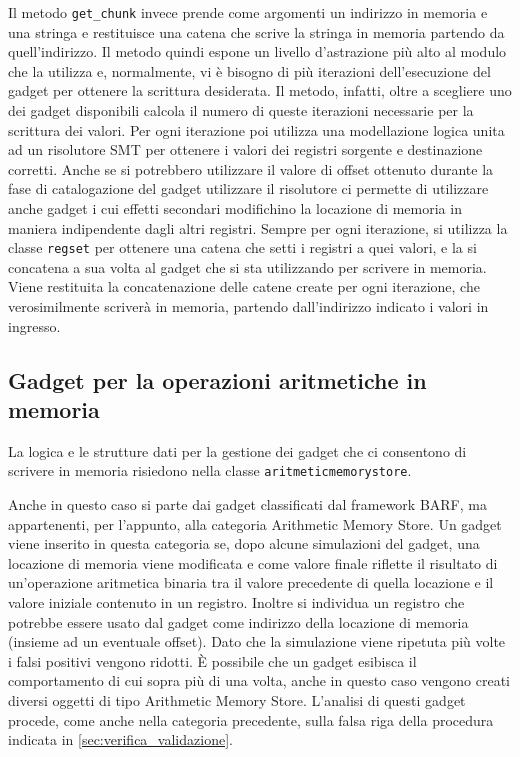 Il metodo \lstinline{get_chunk} invece prende come argomenti un
indirizzo in memoria e una stringa e restituisce una catena che scrive
la stringa in memoria partendo da quell'indirizzo. Il metodo quindi
espone un livello d'astrazione più alto al modulo che la utilizza e,
normalmente, vi è bisogno di più iterazioni dell'esecuzione del gadget
per ottenere la scrittura desiderata. Il metodo, infatti, oltre a
scegliere uno dei gadget disponibili calcola il numero di queste
iterazioni necessarie per la scrittura dei valori. Per ogni iterazione
poi utilizza una modellazione logica unita ad un risolutore SMT per
ottenere i valori dei registri sorgente e destinazione corretti. Anche
se si potrebbero utilizzare il valore di offset ottenuto durante la
fase di catalogazione del gadget utilizzare il risolutore ci permette
di utilizzare anche gadget i cui effetti secondari modifichino la
locazione di memoria in maniera indipendente dagli altri
registri. Sempre per ogni iterazione, si utilizza la classe
\lstinline{regset} per ottenere una catena che setti i registri a quei
valori, e la si concatena a sua volta al gadget che si sta utilizzando
per scrivere in memoria. Viene restituita la concatenazione delle
catene create per ogni iterazione, che verosimilmente scriverà in
memoria, partendo dall'indirizzo indicato i valori in ingresso.

\subsection{Gadget per la operazioni aritmetiche in
  memoria}
\label{sec:arithmeticstore}

La logica e le strutture dati per la gestione dei gadget che ci
consentono di scrivere in memoria risiedono nella classe
\lstinline{aritmeticmemorystore}.

Anche in questo caso si parte dai gadget classificati dal framework
BARF, ma appartenenti, per l'appunto, alla categoria Arithmetic Memory
Store. Un gadget viene inserito in questa categoria se, dopo alcune
simulazioni del gadget, una locazione di memoria viene modificata e
come valore finale riflette il risultato di un'operazione aritmetica
binaria tra il valore precedente di quella locazione e il valore
iniziale contenuto in un registro. Inoltre si individua un registro
che potrebbe essere usato dal gadget come indirizzo della locazione di
memoria (insieme ad un eventuale offset). Dato che la simulazione
viene ripetuta più volte i falsi positivi vengono ridotti. È possibile
che un gadget esibisca il comportamento di cui sopra più di una volta,
anche in questo caso vengono creati diversi oggetti di tipo Arithmetic
Memory Store. L'analisi di questi gadget procede, come anche nella categoria
precedente, sulla falsa riga della procedura indicata in
\ref{sec:verifica_validazione}.

